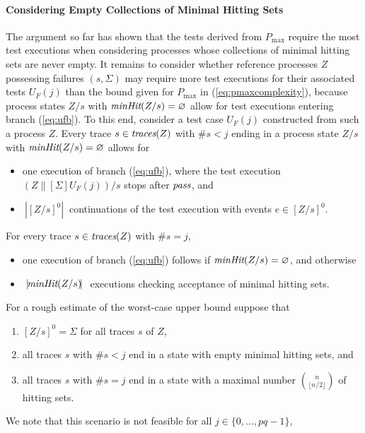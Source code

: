 \documentclass[3p,times]{elsarticle}
\newcommand{\trc}{\text{\it traces}}
\newcommand{\fails}{\text{\it failures}}
\newcommand{\epass}{{\text{\it pass}}}
\newcommand{\minaccs}{\text{\it minAcc}}
\newcommand{\maxrefs}{\text{\it maxRef}}
\newcommand{\minhits}{\text{\it minHit}}
\newcommand{\card}[1]{{~|\! #1\!|~}}
\newcommand{\pmax}{P_\text{max}}
\begin{document}
\paragraph{Considering Empty Collections of Minimal Hitting Sets}
The argument so far has shown that the tests derived from $\pmax$ require the
most test executions when considering processes whose collections of minimal
hitting sets are never empty. %
%
It remains to consider whether reference processes $Z$ possessing failures
$(s,\Sigma)$ may require more test executions for their associated tests
$U_F(j)$ than the bound given for $\pmax$ in (\ref{eq:pmaxcomplexity}),
because process states $Z/s$ with $\minhits(Z/s)=\varnothing$ allow for test
executions entering branch (\ref{eq:ufb}). To this end, consider a test case
$U_F(j)$ constructed from such a process $Z$. Every trace $s\in\trc(Z)$ with
$\#s<j$ ending in a process state $Z/s$ with $\minhits(Z/s)=\varnothing$
allows for
%
\begin{itemize}
\item one execution of branch (\ref{eq:ufb}), where the test execution
$(Z\parallel[\Sigma]U_F(j))/s$ stops after $\epass$, and
\item $\card{[Z/s]^0}$   continuations of the test execution with events $e\in [Z/s]^0$.
\end{itemize}
%
For every trace $s\in\trc(Z)$ with $\#s=j$,
%
\begin{itemize}
\item one execution of branch (\ref{eq:ufb}) follows if
$\minhits(Z/s)=\varnothing$, and otherwise
\item $\card{\minhits(Z/s)}$ executions checking acceptance of minimal hitting sets.
\end{itemize}
%
For a rough estimate of the worst-case upper bound suppose that
%
\begin{enumerate}
\item $[Z/s]^0 = \Sigma$ for all traces $s$ of $Z$,
\item all traces $s$ with $\#s<j$ end in a state with empty minimal hitting sets, and
\item all traces $s$ with $\#s=j$ end in a state with a maximal number $\binom{n}{\lfloor n/2\rfloor}$
 of hitting sets.
\end{enumerate}
%
We note that this scenario is not feasible for all $j\in\{0,\dots,pq-1\}$,
\end{document}
